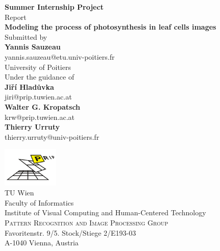\begin{titlepage}

\begin{center}

\textup{\small {\bf Summer Internship Project} \\ Report}\\[0.3in]

\Large \textbf {Modeling the process of photosynthesis in leaf cells images}\\[0.7in]

\normalsize Submitted by \\[0.2in]
\textbf{Yannis Sauzeau}\\
yannis.sauzeau@etu.univ-poitiers.fr\\
University of Poitiers\\

\vspace{.2in}
Under the guidance of\\[0.2in]
\textbf{Jiří Hladůvka}\\
jiri@prip.tuwien.ac.at\\
\vspace{0.1cm}
\textbf{Walter G. Kropatsch}\\
krw@prip.tuwien.ac.at\\
\vspace{0.1cm}
\textbf{Thierry Urruty}\\
thierry.urruty@univ-poitiers.fr



\vspace{.3in}

\includegraphics[width=0.2\textwidth]{figures/prip.png}\\[0.1in]
\Large{
TU Wien\\
\vspace{0.1cm}
Faculty of Informatics\\
\vspace{0.1cm}
Institute of Visual Computing and Human-Centered Technology}\\
\normalsize
\vspace{0.25cm}
\textsc{Pattern Recognition and Image Processing Group}\\
\vspace{0.15cm}
Favoritenstr. 9/5. Stock/Stiege 2/E193-03\\
A-1040 Vienna, Austria \\

\end{center}

\end{titlepage}
